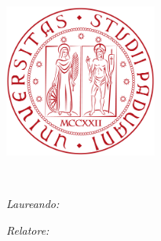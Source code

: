 \begin{titlepage}
	\begin{addmargin}[-1cm]{-3cm}
    \begin{center}
        \large  

        \hfill

        \vfill

        \begingroup
        	\textcolor{redUni}{\textls[160]{\scshape{\huge \myUni}}}\\ \bigskip
        	
        	\textls[80]{\scshape{\huge \myDepartment}}\\ \medskip
        	
			\textls[80]{\scshape{\LARGE \myDegree}}\\
            
        \endgroup

        \vfill

        \includegraphics[width=5cm]{gfx/unipd_sigillo} \\ \medskip
		
		\vfill		
		
		\textcolor{redUni}{\textls[80]{\scshape{\huge \myTitle}}} \\ \medskip
        
        \vfill
        
        
		\begin{minipage}{0.5\textwidth}
			\begin{flushleft}
			\emph{Laureando:}\\
			\textsc{\Large \myName}
			\end{flushleft}
		\end{minipage}
		\begin{minipage}{0.5\textwidth}
			\begin{flushright}
			\emph{Relatore:}\\
			\textsc{\Large \myProf}
			\end{flushright}
		\end{minipage}        
        
		\vfill

        \myTime
                    

    \end{center}  
  \end{addmargin}       
\end{titlepage}   